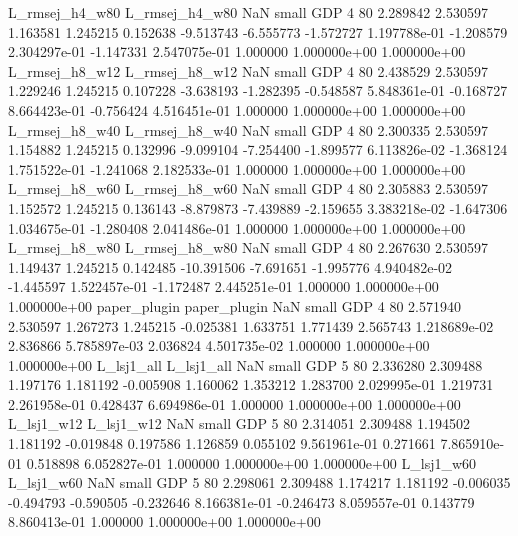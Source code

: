 L_rmsej_h4_w80 L_rmsej_h4_w80                   NaN      small      GDP                 4 80 2.289842       2.530597 1.163581       1.245215    0.152638     -9.513743     -6.555773    -1.572727   1.197788e-01 -1.208579 2.304297e-01    -1.147331   2.547075e-01            1.000000    1.000000e+00        1.000000e+00
L_rmsej_h8_w12 L_rmsej_h8_w12                   NaN      small      GDP                 4 80 2.438529       2.530597 1.229246       1.245215    0.107228     -3.638193     -1.282395    -0.548587   5.848361e-01 -0.168727 8.664423e-01    -0.756424   4.516451e-01            1.000000    1.000000e+00        1.000000e+00
L_rmsej_h8_w40 L_rmsej_h8_w40                   NaN      small      GDP                 4 80 2.300335       2.530597 1.154882       1.245215    0.132996     -9.099104     -7.254400    -1.899577   6.113826e-02 -1.368124 1.751522e-01    -1.241068   2.182533e-01            1.000000    1.000000e+00        1.000000e+00
L_rmsej_h8_w60 L_rmsej_h8_w60                   NaN      small      GDP                 4 80 2.305883       2.530597 1.152572       1.245215    0.136143     -8.879873     -7.439889    -2.159655   3.383218e-02 -1.647306 1.034675e-01    -1.280408   2.041486e-01            1.000000    1.000000e+00        1.000000e+00
L_rmsej_h8_w80 L_rmsej_h8_w80                   NaN      small      GDP                 4 80 2.267630       2.530597 1.149437       1.245215    0.142485    -10.391506     -7.691651    -1.995776   4.940482e-02 -1.445597 1.522457e-01    -1.172487   2.445251e-01            1.000000    1.000000e+00        1.000000e+00
  paper_plugin   paper_plugin                   NaN      small      GDP                 4 80 2.571940       2.530597 1.267273       1.245215   -0.025381      1.633751      1.771439     2.565743   1.218689e-02  2.836866 5.785897e-03     2.036824   4.501735e-02            1.000000    1.000000e+00        1.000000e+00
    L_lsj1_all     L_lsj1_all                   NaN      small      GDP                 5 80 2.336280       2.309488 1.197176       1.181192   -0.005908      1.160062      1.353212     1.283700   2.029995e-01  1.219731 2.261958e-01     0.428437   6.694986e-01            1.000000    1.000000e+00        1.000000e+00
    L_lsj1_w12     L_lsj1_w12                   NaN      small      GDP                 5 80 2.314051       2.309488 1.194502       1.181192   -0.019848      0.197586      1.126859     0.055102   9.561961e-01  0.271661 7.865910e-01     0.518898   6.052827e-01            1.000000    1.000000e+00        1.000000e+00
    L_lsj1_w60     L_lsj1_w60                   NaN      small      GDP                 5 80 2.298061       2.309488 1.174217       1.181192   -0.006035     -0.494793     -0.590505    -0.232646   8.166381e-01 -0.246473 8.059557e-01     0.143779   8.860413e-01            1.000000    1.000000e+00        1.000000e+00
